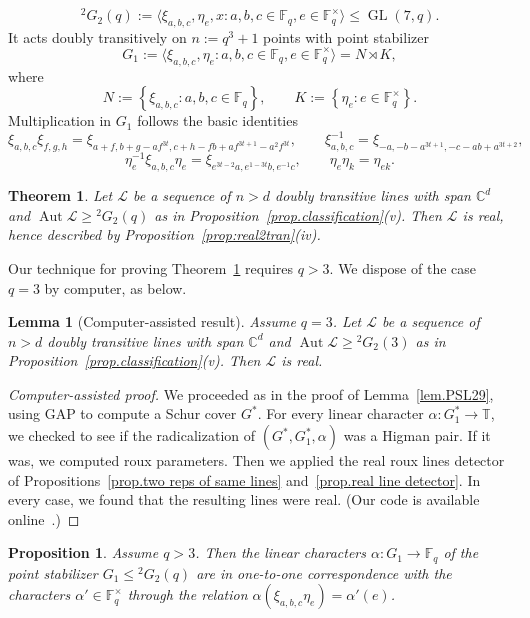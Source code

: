 \documentclass[11pt]{article}
\newtheorem{proposition}[theo]{Proposition}
\newtheorem{theorem}[theo]{Theorem}
\newtheorem{lemma}[theo]{Lemma}
\theoremstyle{definition}
\numberwithin{equation}{section}
\begin{document}
\[
{}^2G_2(q) := \langle \xi_{a,b,c}, \eta_e, x : a,b,c \in \mathbb{F}_q, e \in \mathbb{F}_q^\times \rangle \leq \operatorname{GL}(7,q).
\]
It acts doubly transitively on $n := q^3 + 1$ points with point stabilizer
\[
G_1 := \langle \xi_{a,b,c}, \eta_e : a,b,c \in \mathbb{F}_q, e \in \mathbb{F}_q^\times \rangle
=
N \rtimes K,
\]
where
\[
N := \left\{ \xi_{a,b,c} : a,b,c \in \mathbb{F}_q \right\},
\qquad
K := \left\{ \eta_e : e \in \mathbb{F}_q^\times \right\}.
\]
Multiplication in $G_1$ follows the basic identities
\[
\xi_{a,b,c} \xi_{f,g,h}
=
\xi_{a+f,b+g-af^{3t},c+h-fb+af^{3t+1}-a^2f^{3t}},
\qquad
\xi_{a,b,c}^{-1}
=
\xi_{-a, -b-a^{3t+1}, -c-ab+a^{3t+2} },
\]
\[
\eta_e^{-1} \xi_{a,b,c} \eta_e
=
\xi_{e^{3t-2} a, e^{1-3t} b, e^{-1} c},
\qquad
\eta_e \eta_k = \eta_{ek}.
\]

\begin{theorem}
\label{thm:Ree}
Let $\mathscr{L}$ be a sequence of $n > d$ doubly transitive lines with span $\mathbb{C}^d$ and $\operatorname{Aut} \mathscr{L} \geq {}^2G_2(q)$ as in Proposition~\ref{prop.classification}(v).
Then $\mathscr{L}$ is real, hence described by Proposition~\ref{prop:real2tran}(iv).
\end{theorem}

Our technique for proving Theorem~\ref{thm:Ree} requires $q>3$.
We dispose of the case $q=3$ by computer, as below.

\begin{lemma}
[Computer-assisted result]
Assume $q=3$.
Let $\mathscr{L}$ be a sequence of $n > d$ doubly transitive lines with span $\mathbb{C}^d$ and $\operatorname{Aut} \mathscr{L} \geq {}^2G_2(3)$ as in Proposition~\ref{prop.classification}(v).
Then $\mathscr{L}$ is real.
\end{lemma}

\begin{proof}[Computer-assisted proof]
We proceeded as in the proof of Lemma~\ref{lem.PSL29}, using GAP to compute a Schur cover $G^*$.
For every linear character $\alpha \colon G_1^* \to \mathbb{T}$, we checked to see if the radicalization of $(G^*,G_1^*,\alpha)$ was a Higman pair.
If it was, we computed roux parameters.
Then we applied the real roux lines detector of Propositions~\ref{prop.two reps of same lines} and~\ref{prop.real line detector}.
In every case, we found that the resulting lines were real.
(Our code is available online~\cite{github}.)
\end{proof}

\begin{proposition}
\label{prop:ReeStab}
Assume $q > 3$.
Then the linear characters $\alpha \colon G_1 \to \mathbb{F}_q$ of the point stabilizer $G_1 \leq {}^2G_2(q)$ are in one-to-one correspondence with the characters $\alpha' \in \mathbb{F}_q^\times$ through the relation $\alpha(\xi_{a,b,c} \eta_e) = \alpha'(e)$.
\end{proposition}
\end{document}
